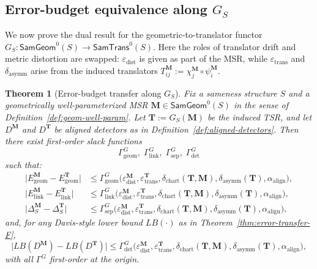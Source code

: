 \documentclass[11pt]{article}
\newtheorem{theorem}{Theorem}
\newcommand{\SamTrans}{\mathsf{SamTrans}}
\newcommand{\SamGeom}{\mathsf{SamGeom}}
\begin{document}
\subsection{Error-budget equivalence along \texorpdfstring{$G_S$}{G\_S}}
\label{subsec:error-transfer-G}

We now prove the dual result for the geometric-to-translator functor
$G_S : \SamGeom^0(S) \to \SamTrans^0(S)$.  Here the roles of translator
drift and metric distortion are swapped: $\varepsilon_{\mathrm{dist}}$ is
given as part of the MSR, while $\varepsilon_{\mathrm{trans}}$ and
$\delta_{\mathrm{asymm}}$ arise from the induced translators
$T^{\mathbf{M}}_{ij} := \chi^{\mathbf{M}}_j \circ \psi^{\mathbf{M}}_i$.

\begin{theorem}[Error-budget transfer along $G_S$]
\label{thm:error-transfer-G}
Fix a sameness structure $S$ and a geometrically well-parameterized MSR
$\mathbf{M} \in \SamGeom^0(S)$ in the sense of
Definition~\ref{def:geom-well-param}.  Let
$\mathbf{T} := G_S(\mathbf{M})$ be the induced TSR, and let
$D^{\mathbf{M}}$ and $D^{\mathbf{T}}$ be aligned detectors as in
Definition~\ref{def:aligned-detectors}.  Then there exist first-order
slack functions
\[
\Gamma^{G}_{\mathrm{geom}},\;
\Gamma^{G}_{\mathrm{link}},\;
\Gamma^{G}_{\mathrm{sep}},\;
\Gamma^{G}_{\mathrm{det}}
\]
such that:
\begin{align}
\bigl|
  E_{\mathrm{geom}}^{\mathbf{M}} - E_{\mathrm{geom}}^{\mathbf{T}}
\bigr|
&\le
\Gamma^{G}_{\mathrm{geom}}
  \bigl(
    \varepsilon_{\mathrm{dist}}^{\mathbf{M}},
    \varepsilon_{\mathrm{trans}}^{\mathbf{T}},
    \delta_{\mathrm{chart}}(\mathbf{T}, \mathbf{M}),
    \delta_{\mathrm{asymm}}(\mathbf{T}),
    \alpha_{\mathrm{align}}
  \bigr),
\\[0.25em]
\bigl|
  E_{\mathrm{link}}^{\mathbf{M}} - E_{\mathrm{link}}^{\mathbf{T}}
\bigr|
&\le
\Gamma^{G}_{\mathrm{link}}
  \bigl(
    \varepsilon_{\mathrm{dist}}^{\mathbf{M}},
    \varepsilon_{\mathrm{trans}}^{\mathbf{T}},
    \delta_{\mathrm{chart}}(\mathbf{T}, \mathbf{M}),
    \delta_{\mathrm{asymm}}(\mathbf{T}),
    \alpha_{\mathrm{align}}
  \bigr),
\\[0.25em]
\bigl|
  \Delta_S^{\mathbf{M}} - \Delta_S^{\mathbf{T}}
\bigr|
&\le
\Gamma^{G}_{\mathrm{sep}}
  \bigl(
    \varepsilon_{\mathrm{dist}}^{\mathbf{M}},
    \varepsilon_{\mathrm{trans}}^{\mathbf{T}},
    \delta_{\mathrm{chart}}(\mathbf{T}, \mathbf{M}),
    \delta_{\mathrm{asymm}}(\mathbf{T}),
    \alpha_{\mathrm{align}}
  \bigr),
\end{align}
and, for any Davis-style lower bound $LB(\cdot)$ as in
Theorem~\ref{thm:error-transfer-F},
\begin{equation}
\bigl|
  LB(D^{\mathbf{M}}) - LB(D^{\mathbf{T}})
\bigr|
\le
\Gamma^{G}_{\mathrm{det}}
  \bigl(
    \varepsilon_{\mathrm{dist}}^{\mathbf{M}},
    \varepsilon_{\mathrm{trans}}^{\mathbf{T}},
    \delta_{\mathrm{chart}}(\mathbf{T}, \mathbf{M}),
    \delta_{\mathrm{asymm}}(\mathbf{T}),
    \alpha_{\mathrm{align}}
  \bigr),
\end{equation}
with all $\Gamma^{G}$ first-order at the origin.
\end{theorem}
\end{document}
